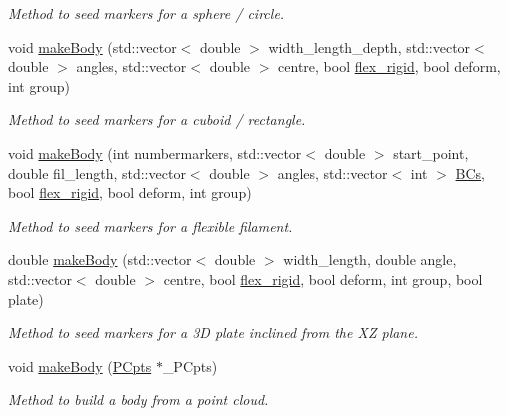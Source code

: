 \begin{DoxyCompactItemize}
\begin{DoxyCompactList}\small\item\em Method to seed markers for a sphere / circle. \end{DoxyCompactList}\item 
void \hyperlink{class_i_b_body_a5c3f3da65bdaca7bee4ebea5a06b8bdd}{make\+Body} (std\+::vector$<$ double $>$ width\+\_\+length\+\_\+depth, std\+::vector$<$ double $>$ angles, std\+::vector$<$ double $>$ centre, bool \hyperlink{class_i_b_body_a526f3e83b45b991a79941ee745698ea5}{flex\+\_\+rigid}, bool deform, int group)
\begin{DoxyCompactList}\small\item\em Method to seed markers for a cuboid / rectangle. \end{DoxyCompactList}\item 
void \hyperlink{class_i_b_body_ab83346d555202a5cf669c7e309dc856a}{make\+Body} (int numbermarkers, std\+::vector$<$ double $>$ start\+\_\+point, double fil\+\_\+length, std\+::vector$<$ double $>$ angles, std\+::vector$<$ int $>$ \hyperlink{class_i_b_body_ad9fa313d9cb2c2c463740eed5a1faf16}{B\+Cs}, bool \hyperlink{class_i_b_body_a526f3e83b45b991a79941ee745698ea5}{flex\+\_\+rigid}, bool deform, int group)
\begin{DoxyCompactList}\small\item\em Method to seed markers for a flexible filament. \end{DoxyCompactList}\item 
double \hyperlink{class_i_b_body_a34380e523aef0978495d52bc91f3d74b}{make\+Body} (std\+::vector$<$ double $>$ width\+\_\+length, double angle, std\+::vector$<$ double $>$ centre, bool \hyperlink{class_i_b_body_a526f3e83b45b991a79941ee745698ea5}{flex\+\_\+rigid}, bool deform, int group, bool plate)
\begin{DoxyCompactList}\small\item\em Method to seed markers for a 3D plate inclined from the XZ plane. \end{DoxyCompactList}\item 
void \hyperlink{class_i_b_body_aad21167e57221cb4faf5a15ffebc438d}{make\+Body} (\hyperlink{class_p_cpts}{P\+Cpts} $\ast$\+\_\+\+P\+Cpts)
\begin{DoxyCompactList}\small\item\em Method to build a body from a point cloud. \end{DoxyCompactList}\end{DoxyCompactItemize}
